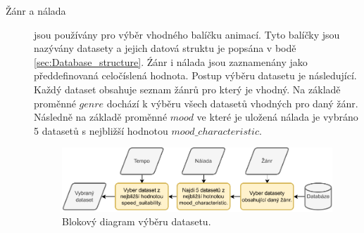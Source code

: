 \begin{description}
    \item[Žánr a nálada] jsou používány pro výběr vhodného balíčku animací. Tyto balíčky jsou nazývány datasety a jejich datová struktu je popsána v bodě \ref{sec:Database_structure}. Źánr i nálada jsou zaznamenány jako předdefinovaná celočíslená hodnota. Postup výběru datasetu je následující. Každý dataset obsahuje seznam žánrů pro který je vhodný. Na základě proměnné $genre$ dochází k výběru všech datasetů vhodných pro daný žánr. Následně na základě proměnné $mood$ ve které je uložená nálada je vybráno 5 datasetů s nejbližší hodnotou $mood\_characteristic$.
    
    \begin{figure}[H]
        \centering
        \includegraphics[width = 1\linewidth]{obrazky/Dataset_selection_diagram.pdf}
        \caption{Blokový diagram výběru datasetu.}
        \label{fig:Dataset_selection_diagram}
    \end{figure}


\end{description}
